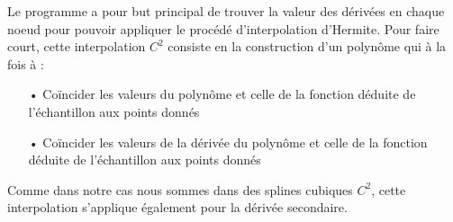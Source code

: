 \documentclass[a4paper,12pt]{article} %
\begin{document}
                Le programme a pour but principal de trouver la valeur des dérivées en chaque noeud pour pouvoir appliquer le procédé d'interpolation d'Hermite. Pour faire court, cette interpolation $C^2$ consiste en la construction d'un polynôme qui à la fois à : 
                \begin{itemize}
                \item[•] Coïncider les valeurs du polynôme et celle de la fonction déduite de l'échantillon aux points donnés
                \item[•] Coïncider les valeurs de la dérivée du polynôme et celle de la fonction déduite de l'échantillon aux points donnés
                \end{itemize}
                Comme dans notre cas nous sommes dans des splines cubiques $C^2$, cette interpolation s'applique également pour la dérivée secondaire.
                
                
            
\end{document}
